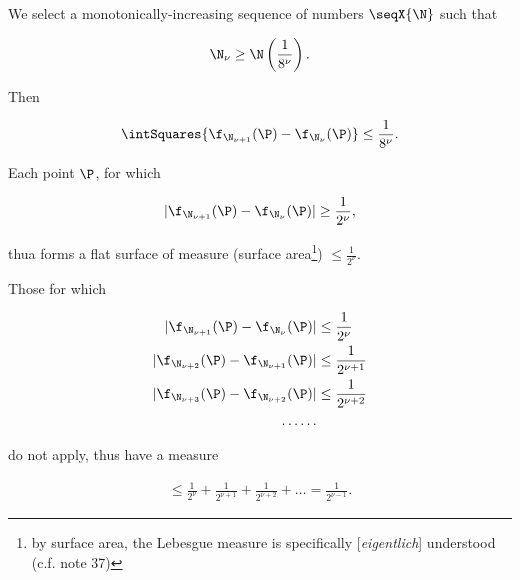 \documentclass{article}
\newcommand{\WTF}[1]{
[\it{\small{#1}}]
}
\newcommand{\uequ}[1]{
\begin{align*}
#1
\end{align*}
}
\newcommand{\inv}[1]{\frac{1}{#1}}
\renewcommand{\it}[1]{\textit{#1}}
\begin{document}
We select a monotonically-increasing sequence of numbers $\seqX{\N}$ such that
\uequ{
\N_\nu \geq \N\left(\inv{8^\nu}\right).
}
Then
\uequ{
\intSquares{\f_{\N_{\nu+1}}(\P) - \f_{\N_\nu}(\P)} \leq \inv{8^\nu}.
}
Each point $\P$, for which
\uequ{
|\f_{\N_{\nu+1}}(\P) - \f_{\N_\nu}(\P)| \geq \inv{2^\nu},
}
thua forms a flat surface of measure (surface area\footnote{by surface area, the Lebesgue measure is specifically\WTF{eigentlich} understood (c.f. note 37)}) $\leq \inv{2^\nu}$.

Those for which
\uequ{
|\f_{\N_{\nu+1}}(\P) - \f_{\N_\nu}(\P)| &\leq \inv{2^\nu}\\
|\f_{\N_{\nu+2}}(\P) - \f_{\N_{\nu+1}}(\P)| &\leq \inv{2^{\nu+1}}\\
|\f_{\N_{\nu+3}}(\P) - \f_{\N_{\nu+2}}(\P)| &\leq \inv{2^{\nu+2}}\\
\dots\dots
}
do not apply, thus have a measure
\uequ{
\leq \inv{2^\nu} + \inv{2^{\nu+1}} + \inv{2^{\nu+2}} + \dots = \inv{2^{\nu-1}}.
}
\end{document}
